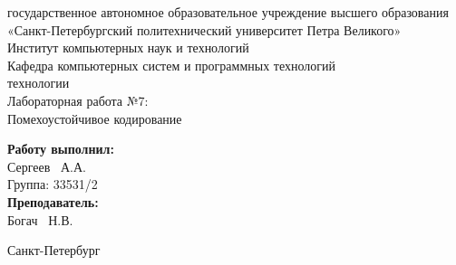 \documentclass[a4paper]{article}
\begin{document}

\begin{titlepage}	%

	\begin{center}		%

		 государственное автономное образовательное учреждение высшего образования «Санкт-Петербургский политехнический университет Петра Великого» \\
		\large Институт компьютерных наук и технологий \\
		\large Кафедра компьютерных систем и программных технологий\\[2cm]
		
	    \vfill
		 технологии\\[0.5cm] %
		\large Лабораторная работа №7:\\
		Помехоустойчивое кодирование\\[4.8cm]

	\end{center}

	\begin{flushright} %
		\begin{minipage}{0.25\textwidth} %
			\begin{flushleft} %

				\large\textbf{Работу выполнил:}\\
				\large Сергеев ~А.А.\\
				\large {Группа:} 33531/2\\
				
				\large \textbf{Преподаватель:}\\
				\large Богач ~Н.В.\\

			\end{flushleft}
		\end{minipage}
	\end{flushright}
	
	\vfill %

	\begin{center}
	\large Санкт-Петербург\\
	\large \the\year %
	\end{center} %

\thispagestyle{empty} %
\end{titlepage} %
\vfill %
\end{document}
